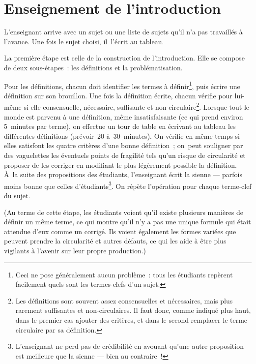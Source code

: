 \documentclass[a4paper,12pt]{report}
\begin{document}
\chapter{Enseignement de l'introduction}
\label{sec:orgc985887}

L'enseignant arrive avec un sujet ou une liste de sujets qu'il n'a pas
travaillés à l'avance. Une fois le sujet choisi, il l'écrit au tableau.

La première étape est celle de la construction de l'introduction. Elle
se compose de deux sous-étapes : les définitions et la problématisation.

Pour les définitions, chacun doit identifier les termes à définir\footnote{Ceci ne pose généralement aucun problème : tous les étudiants
repèrent facilement quels sont les termes-clefs d'un sujet.},
puis écrire une définition sur son brouillon. Une fois la définition
écrite, chacun vérifie pour lui-même si elle consensuelle, nécessaire,
suffisante et non-circulaire\footnote{Les définitions sont souvent assez consensuelles et nécessaires,
mais plus rarement suffisantes et non-circulaires. Il faut donc, comme
indiqué plus haut, dans le premier cas ajouter des critères, et dans le
second remplacer le terme circulaire par sa définition.}. Lorsque tout le monde est parvenu à
une définition, même insatisfaisante (ce qui prend environ 5 minutes par
terme), on effectue un tour de table en écrivant au tableau les
différentes définitions (prévoir 20 à 30 minutes). On vérifie en même
temps si elles satisfont les quatre critères d'une bonne définition ;
on peut souligner par des vaguelettes les éventuels points de fragilité
tels qu'un risque de circularité et proposer de les corriger en
modifiant le plus légèrement possible la définition. À la suite des
propositions des étudiants, l'enseignant écrit la sienne — parfois moins
bonne que celles d'étudiants\footnote{L'enseignant ne perd pas de crédibilité en avouant qu'une autre
proposition est meilleure que la sienne --- bien au contraire !}. On répète l'opération pour chaque
terme-clef du sujet.

(Au terme de cette étape, les étudiants voient qu'il existe plusieurs
manières de définir un même terme, ce qui montre qu'il n'y a pas une
unique formule qui était attendue d'eux comme un corrigé. Ils voient
également les formes variées que peuvent prendre la circularité et
autres défauts, ce qui les aide à être plus vigilants à l'avenir sur
leur propre production.)
\end{document}
